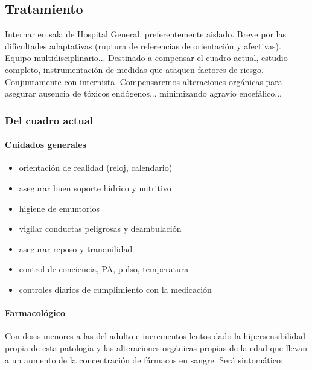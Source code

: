 \subsection*{Tratamiento}

Internar en sala de Hospital General, preferentemente aislado. Breve por las dificultades adaptativas (ruptura de referencias de orientación y afectivas). Equipo multidisciplinario... Destinado a compensar el cuadro actual, estudio completo, instrumentación de medidas que ataquen factores de riesgo. Conjuntamente con internista. Compensaremos alteraciones orgánicas para asegurar ausencia de tóxicos endógenos... minimizando agravio encefálico...

\subsubsection{Del cuadro actual}
\paragraph{Cuidados generales}
\begin{itemize}
	\item orientación de realidad (reloj, calendario)
	\item asegurar buen soporte hídrico y nutritivo
	\item higiene de emuntorios
	\item vigilar conductas peligrosas y deambulación
	\item asegurar reposo y tranquilidad
	\item control de conciencia, PA, pulso, temperatura
	\item controles diarios de cumplimiento con la medicación
\end{itemize}
\paragraph{Farmacológico}
Con dosis menores a las del adulto e incrementos lentos dado la hipersensibilidad propia de esta patología y las alteraciones orgánicas propias de la edad que llevan a un aumento de la concentración de fármacos en sangre. Será sintomático:

